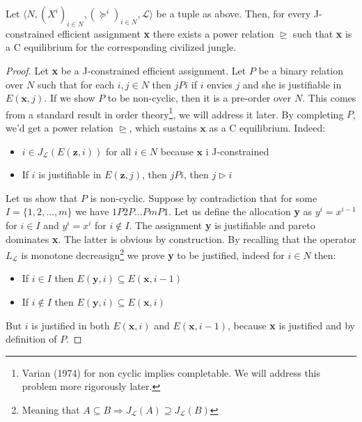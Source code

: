 

\begin{theorem}
    Let $\langle N,(X^i)_{i\in N}, (\succeq^i)_{i\in N}, \mathcal{L}\rangle$ be a tuple as above. Then, for every J-constrained efficient assignment \textbf{x} there exists a power relation $\trianglerighteq$ such that \textbf{x} is a C equilibrium for the corresponding civilized jungle. 

    \begin{proof}
        Let \textbf{x} be a J-constrained efficient assignment. Let $P$ be a binary relation over $N$ such that for each $i,j\in N$ then $jPi$ if $i$ envies $j$ and she is justifiable in $E(\textbf{x},j)$. If we show $P$ to be non-cyclic, then it is a pre-order over $N$. This comes from a standard result in order theory\footnote{Varian\cite{VARIAN197463} (1974) for non cyclic implies completable. We will address this problem more rigorously later.}, we will address it later. By completing $P$, we'd get a power relation $\trianglerighteq$, which sustains $\textbf{x}$ as a C equilibrium. Indeed:
        \begin{itemize}
            \item $i\in J_{\mathcal{L}}(E(\textbf{z},i))$ for all $i\in N$ because $\textbf{x}$ i J-constrained
            \item If $i$ is justifiable in $E(\textbf{z},j)$, then $jPi$, then $j\triangleright i$
        \end{itemize}

        Let us show that $P$ is non-cyclic. Suppose by contradiction that for some $I=\{1,2,\dots,m\}$ we have $1P2P\dots PmP1$. Let us define the allocation \textbf{y} as $y^i=x^{i-1}$ for $i\in I$ and $y^i=x^i$ for $i\notin I$. The assignment \textbf{y} is justifiable and pareto dominates \textbf{x}. The latter is obvious by construction. By recalling that the operator $L_{\mathcal{L}}$ is monotone decreasign\footnote{Meaning that $A\subseteq B\Rightarrow J_{\mathcal{L}}(A)\supseteq J_{\mathcal{L}}(B)$} we prove \textbf{y} to be justified, indeed for $i\in N$ then:
        \begin{itemize}
            \item If $i\in I$ then $E(\textbf{y},i)\subseteq E(\textbf{x},i-1)$ 
            \item If $i\notin I$ then $E(\textbf{y},i)\subseteq E(\textbf{x},i)$
        \end{itemize}

        But $i$ is justified in both $E(\textbf{x},i)$ and $E(\textbf{x},i-1)$, because \textbf{x} is justified and by definition of $P$.
    \end{proof}
\end{theorem}


